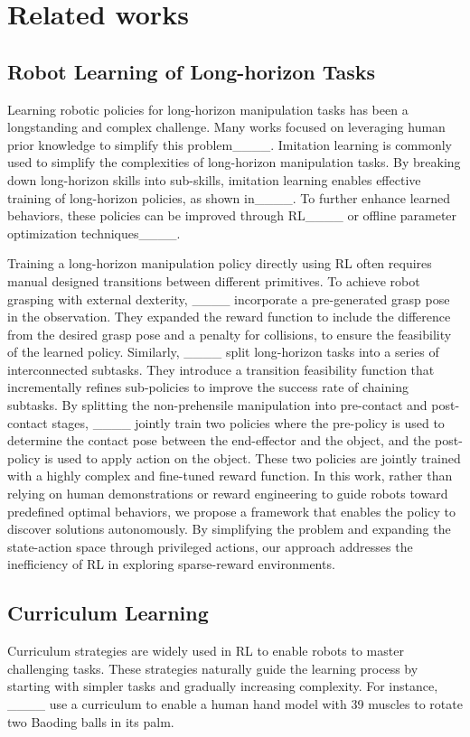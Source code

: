 \section{Related works}
\subsection{Robot Learning of Long-horizon Tasks}
Learning robotic policies for long-horizon manipulation tasks has been a longstanding and complex challenge. Many works focused on leveraging human prior knowledge to simplify this problem____.
Imitation learning is commonly used to simplify the complexities of long-horizon manipulation tasks. By breaking down long-horizon skills into sub-skills, imitation learning enables effective training of long-horizon policies, as shown in____. To further enhance learned behaviors, these policies can be improved through RL____ or offline parameter optimization techniques____.

Training a long-horizon manipulation policy directly using RL often requires manual designed transitions between different primitives. To achieve robot grasping with external dexterity, ____ incorporate a pre-generated grasp pose in the observation. They expanded the reward function to include the difference from the desired grasp pose and a penalty for collisions, to ensure the feasibility of the learned policy. Similarly, ____ split long-horizon tasks into a series of interconnected subtasks. They introduce a transition feasibility function that incrementally refines sub-policies to improve the success rate of chaining subtasks.
By splitting the non-prehensile manipulation into pre-contact and post-contact stages, ____ jointly train two policies where the pre-policy is used to determine the contact pose between the end-effector and the object, and the post-policy is used to apply action on the object. These two policies are jointly trained with a highly complex and fine-tuned reward function. In this work, rather than relying on human demonstrations or reward engineering to guide robots toward predefined optimal behaviors, we propose a framework that enables the policy to discover solutions autonomously. By simplifying the problem and expanding the state-action space through privileged actions, our approach addresses the inefficiency of RL in exploring sparse-reward environments.


\subsection{Curriculum Learning}
Curriculum strategies are widely used in RL to enable robots to master challenging tasks. These strategies naturally guide the learning process by starting with simpler tasks and gradually increasing complexity. For instance, ____ use a curriculum to enable a human hand model with 39 muscles to rotate two Baoding balls in its palm.

